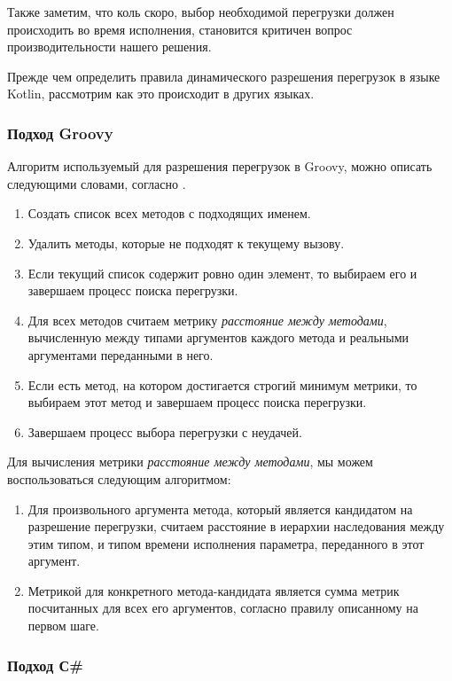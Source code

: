 Также заметим, что коль скоро, выбор необходимой перегрузки должен происходить во время исполнения, становится критичен вопрос производительности нашего решения.

Прежде чем определить правила динамического разрешения перегрузок в языке Kotlin, рассмотрим как это происходит в других языках.

\subsubsection{Подход Groovy}

Алгоритм используемый для разрешения перегрузок в Groovy, можно описать следующими словами, согласно \cite{groovy:selectingOverloadsAtRuntime}.

\begin{enumerate}
    \item Создать список всех методов с подходящих именем.
    \item Удалить методы, которые не подходят к текущему вызову.
    \item Если текущий список содержит ровно один элемент, то выбираем его и завершаем процесс поиска перегрузки.
    \item Для всех методов считаем метрику \textit{расстояние между методами}, вычисленную между типами аргументов каждого метода и реальными аргументами переданными в него.
    \item Если есть метод, на котором достигается строгий минимум метрики, то выбираем этот метод и завершаем процесс поиска перегрузки.
    \item Завершаем процесс выбора перегрузки с неудачей.
\end{enumerate}

Для вычисления метрики \textit{расстояние между методами}, мы можем воспользоваться следующим алгоритмом:
\begin{enumerate}
    \item Для произвольного аргумента метода, который является кандидатом на разрешение перегрузки, считаем расстояние в иерархии наследования между этим типом, и типом времени исполнения параметра, переданного в этот аргумент.
    \item Метрикой для конкретного метода-кандидата является сумма метрик посчитанных для всех его аргументов, согласно правилу описанному на первом шаге.
\end{enumerate}


\subsubsection{Подход С{\#}}

